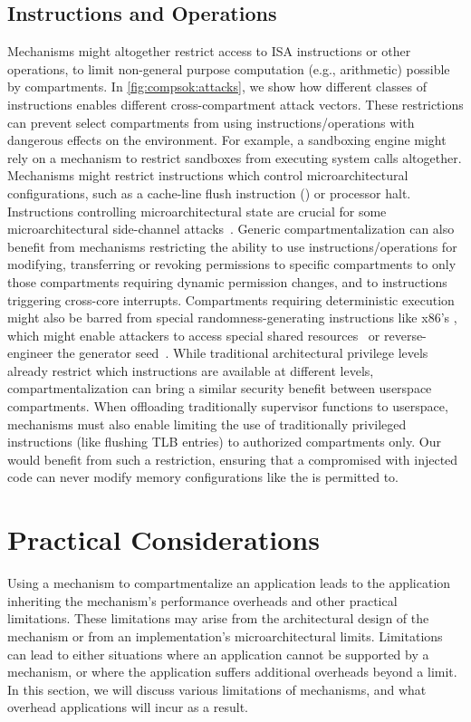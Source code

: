 \subsection{Instructions and Operations}
Mechanisms might altogether restrict access to ISA instructions or other
operations, to limit non-general purpose computation (e.g., arithmetic)
possible by compartments. 
In \autoref{fig:compsok:attacks}, we show how different classes of
instructions enables different cross-compartment attack vectors.
These restrictions can prevent select compartments from using 
instructions/operations with dangerous effects on the environment.
For example, a sandboxing engine might rely on a mechanism to restrict
sandboxes from executing system calls altogether.
Mechanisms might restrict instructions which
control microarchitectural configurations, such as a cache-line flush
instruction () or processor halt.
Instructions controlling microarchitectural state are crucial for
some microarchitectural side-channel attacks~\cite{YaromF14, gruss16flush}.
Generic compartmentalization can also benefit from mechanisms restricting
the ability to use instructions/operations for modifying, transferring or
revoking permissions to specific compartments to only those compartments
requiring dynamic permission changes, and to instructions triggering
cross-core interrupts.
Compartments requiring deterministic execution might also be barred from
special randomness-generating instructions like x86's , which
might enable attackers to access special shared resources~\cite{RagabMRBG21}
or reverse-engineer the generator seed~\cite{ArgyrosK12, CohneyGH18}.
While traditional architectural privilege levels already restrict which
instructions are available at different levels, compartmentalization can
bring a similar security benefit between userspace compartments.
When offloading traditionally supervisor functions to userspace, mechanisms
must also enable limiting the use of traditionally privileged 
instructions (like flushing TLB entries) to authorized compartments only.
Our \browser would benefit from such a restriction, ensuring that a 
compromised \sandbox with injected code can never modify memory configurations
like the \manager is permitted to.

\section{Practical Considerations}
\label{sec:compsok:practicals}
Using a mechanism to compartmentalize an application leads to the application
inheriting the mechanism's performance overheads and other practical limitations.
These limitations may arise from the architectural design of the mechanism or
from an implementation's microarchitectural limits. 
Limitations can lead to either situations where an application cannot be
supported by a mechanism, or where the application suffers additional
overheads beyond a limit.
In this section, we will discuss various limitations of mechanisms, and what
overhead applications will incur as a result.

